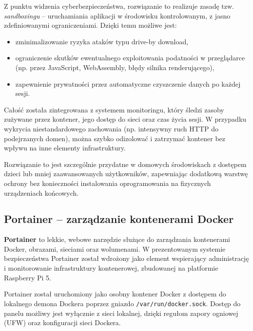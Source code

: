 \documentclass[
    left=2.5cm,         %
    right=2.5cm,        %
    top=2.5cm,          %
    bottom=3cm,         %
    bindingoffset=6mm,  %
    nohyphenation=true %
]{eiti/eiti-thesis} %
\begin{document}
Z punktu widzenia cyberbezpieczeństwa, rozwiązanie to realizuje zasadę tzw. \textit{sandboxingu} – uruchamiania aplikacji w środowisku kontrolowanym, z jasno zdefiniowanymi ograniczeniami. Dzięki temu możliwe jest:
\begin{itemize}
    \item zminimalizowanie ryzyka ataków typu drive-by download,
    \item ograniczenie skutków ewentualnego exploitowania podatności w przeglądarce (np. przez JavaScript, WebAssembly, błędy silnika renderującego),
    \item zapewnienie prywatności przez automatyczne czyszczenie danych po każdej sesji.
\end{itemize}

Całość została zintegrowana z systemem monitoringu, który śledzi zasoby zużywane przez kontener, jego dostęp do sieci oraz czas życia sesji. W przypadku wykrycia niestandardowego zachowania (np. intensywny ruch HTTP do podejrzanych domen), można szybko odizolować i zatrzymać kontener bez wpływu na inne elementy infrastruktury.

Rozwiązanie to jest szczególnie przydatne w domowych środowiskach z dostępem dzieci lub mniej zaawansowanych użytkowników, zapewniając dodatkową warstwę ochrony bez konieczności instalowania oprogramowania na fizycznych urządzeniach końcowych.


\subsection{Portainer – zarządzanie kontenerami Docker}

\textbf{Portainer}\cite{portainer-docs} to lekkie, webowe narzędzie służące do zarządzania kontenerami Docker, obrazami, sieciami oraz wolumenami. W prezentowanym systemie bezpieczeństwa Portainer został wdrożony jako element wspierający administrację i monitorowanie infrastruktury kontenerowej, zbudowanej na platformie Raspberry Pi 5.

Portainer został uruchomiony jako osobny kontener Docker z dostępem do lokalnego demona Dockera poprzez gniazdo \texttt{/var/run/docker.sock}. Dostęp do panelu możliwy jest wyłącznie z sieci lokalnej, dzięki regułom zapory ogniowej (UFW) oraz konfiguracji sieci Dockera.
\end{document}
